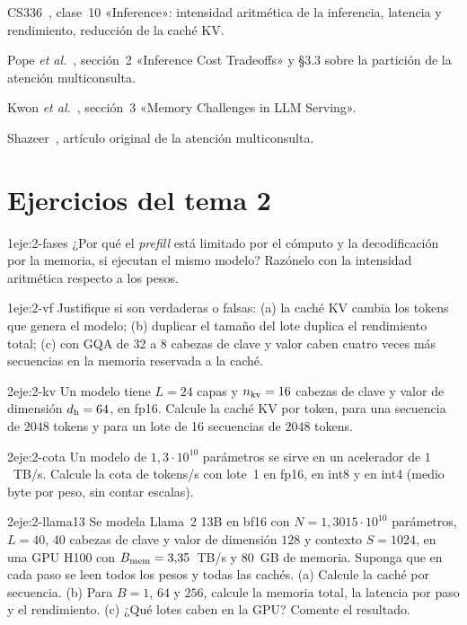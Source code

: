 \begin{lecturas}
\item CS336~\cite{cs336}, clase~10 «Inference»: intensidad aritmética de la inferencia, latencia y rendimiento, reducción de la caché KV.
\item Pope \emph{et al.}~\cite{pope}, sección~2 «Inference Cost Tradeoffs» y §3.3 sobre la partición de la atención multiconsulta.
\item Kwon \emph{et al.}~\cite{kwon}, sección~3 «Memory Challenges in LLM Serving».
\item Shazeer~\cite{shazeer}, artículo original de la atención multiconsulta.
\end{lecturas}

\section*{Ejercicios del tema 2}

\begin{ejercicio}{1}{eje:2-fases}
¿Por qué el \emph{prefill} está limitado por el cómputo y la decodificación por la memoria, si ejecutan el mismo modelo? Razónelo con la intensidad aritmética respecto a los pesos.
\end{ejercicio}

\begin{ejercicio}{1}{eje:2-vf}
Justifique si son verdaderas o falsas: (a) la caché KV cambia los tokens que genera el modelo; (b) duplicar el tamaño del lote duplica el rendimiento total; (c) con GQA de 32 a 8 cabezas de clave y valor caben cuatro veces más secuencias en la memoria reservada a la caché.
\end{ejercicio}

\begin{ejercicio}{2}{eje:2-kv}
Un modelo tiene $L=24$ capas y $n_{\mathrm{kv}}=16$ cabezas de clave y valor de dimensión $d_{\mathrm{h}}=64$, en fp16. Calcule la caché KV por token, para una secuencia de $2048$ tokens y para un lote de 16 secuencias de $2048$ tokens.
\end{ejercicio}

\begin{ejercicio}{2}{eje:2-cota}
Un modelo de $1{,}3\cdot 10^{10}$ parámetros se sirve en un acelerador de $1$~TB/s. Calcule la cota de tokens/s con lote~1 en fp16, en int8 y en int4 (medio byte por peso, sin contar escalas).
\end{ejercicio}

\begin{ejercicio}{2}{eje:2-llama13}
Se modela Llama~2 13B en bf16 con $N=1{,}3015\cdot 10^{10}$ parámetros, $L=40$, $40$ cabezas de clave y valor de dimensión $128$ y contexto $S=1024$, en una GPU H100 con $B_{\mathrm{mem}}=3{,}35$~TB/s y 80~GB de memoria. Suponga que en cada paso se leen todos los pesos y todas las cachés. (a) Calcule la caché por secuencia. (b) Para $B=1$, $64$ y $256$, calcule la memoria total, la latencia por paso y el rendimiento. (c) ¿Qué lotes caben en la GPU? Comente el resultado.
\end{ejercicio}

